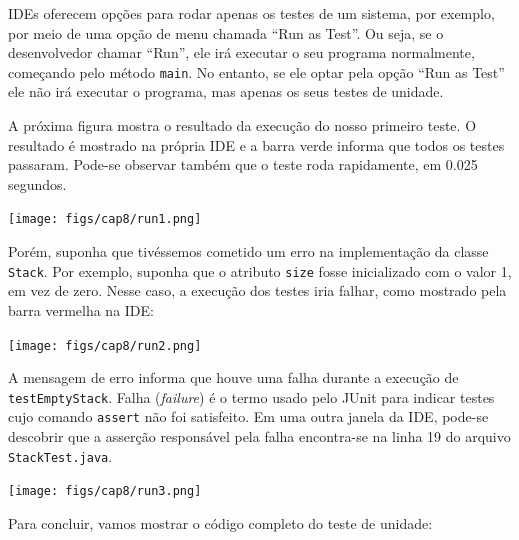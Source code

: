 \documentclass[
  11pt,
  twoside]{book}
\newcommand{\passthrough}[1]{#1}
\begin{document}
  IDEs oferecem opções para
rodar apenas os testes de um sistema, por exemplo, por meio de uma opção
de menu chamada ``Run as Test''. Ou seja, se o desenvolvedor chamar
``Run'', ele irá executar o seu programa normalmente, começando pelo
método \passthrough{\lstinline!main!}. No entanto, se ele optar pela
opção ``Run as Test'' ele não irá executar o programa, mas apenas os
seus testes de unidade.

A próxima figura mostra o resultado da execução do nosso primeiro teste.
O resultado é mostrado na própria IDE e a barra verde informa que todos
os testes passaram. Pode-se observar também que o teste roda
rapidamente, em 0.025 segundos.

\texttt{[image: figs/cap8/run1.png]}

Porém, suponha que tivéssemos cometido um erro na implementação da
classe \passthrough{\lstinline!Stack!}. Por exemplo, suponha que o
atributo \passthrough{\lstinline!size!} fosse inicializado com o valor
1, em vez de zero. Nesse caso, a execução dos testes iria falhar, como
mostrado pela barra vermelha na IDE:

\texttt{[image: figs/cap8/run2.png]}

A mensagem de erro informa que houve uma falha durante a execução de
\passthrough{\lstinline!testEmptyStack!}. Falha (\emph{failure}) é o
termo usado pelo JUnit para indicar testes cujo comando
\passthrough{\lstinline!assert!} não foi satisfeito. Em uma outra janela
da IDE, pode-se descobrir que a asserção responsável pela falha
encontra-se na linha 19 do arquivo
\passthrough{\lstinline!StackTest.java!}.

\texttt{[image: figs/cap8/run3.png]}

Para concluir, vamos mostrar o código completo do teste de unidade:
\end{document}
